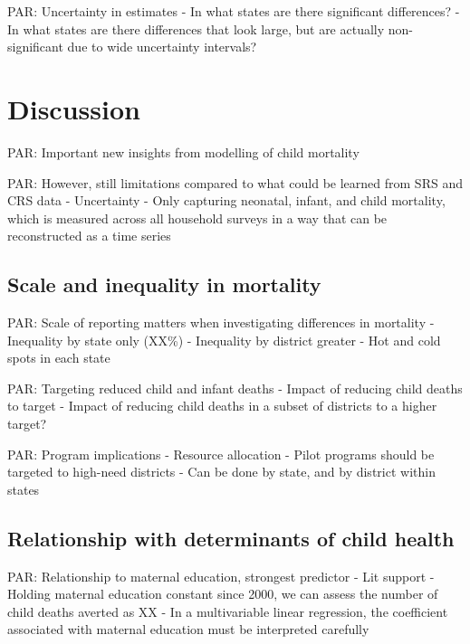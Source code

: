 \documentclass[
]{article}
\begin{document}
PAR: Uncertainty in estimates
- In what states are there significant differences?
- In what states are there differences that look large, but are actually non-significant due to wide uncertainty intervals?

\hypertarget{discussion}{%
\section{Discussion}\label{discussion}}

PAR: Important new insights from modelling of child mortality

PAR: However, still limitations compared to what could be learned from SRS and CRS data
- Uncertainty
- Only capturing neonatal, infant, and child mortality, which is measured across all household surveys in a way that can be reconstructed as a time series

\hypertarget{scale-and-inequality-in-mortality}{%
\subsection{Scale and inequality in mortality}\label{scale-and-inequality-in-mortality}}

PAR: Scale of reporting matters when investigating differences in mortality
- Inequality by state only (XX\%)
- Inequality by district greater
- Hot and cold spots in each state

PAR: Targeting reduced child and infant deaths
- Impact of reducing child deaths to target
- Impact of reducing child deaths in a subset of districts to a higher target?

PAR: Program implications
- Resource allocation
- Pilot programs should be targeted to high-need districts
- Can be done by state, and by district within states

\hypertarget{relationship-with-determinants-of-child-health}{%
\subsection{Relationship with determinants of child health}\label{relationship-with-determinants-of-child-health}}

PAR: Relationship to maternal education, strongest predictor
- Lit support
- Holding maternal education constant since 2000, we can assess the number of child deaths
averted as XX
- In a multivariable linear regression, the coefficient associated with maternal education
must be interpreted carefully
\end{document}
